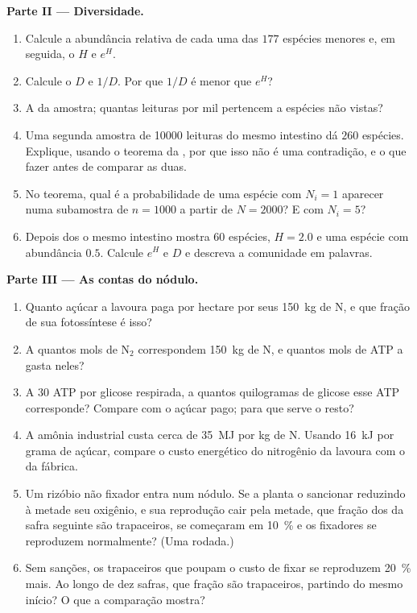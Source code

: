 \begin{problem}
\medskip
\noindent\textbf{Parte II --- Diversidade.}
\begin{enumerate}[resume]
  \item Calcule a abundância relativa de cada uma das $177$ espécies
        menores e, em seguida, o  $H$ e $e^{H}$.
  \item Calcule o  $D$ e $1/D$. Por que $1/D$ é menor
        que $e^{H}$?
  \item A  da amostra; quantas leituras por mil
        pertencem a espécies não vistas?
  \item Uma segunda amostra de \num{10000} leituras do mesmo intestino
        dá $260$ espécies. Explique, usando o teorema da , por
        que isso não é uma contradição, e o que fazer antes de comparar
        as duas.
  \item No teorema, qual é a probabilidade de uma espécie com
        $N_{i} = 1$ aparecer numa subamostra de $n = 1000$ a partir de
        $N =
        2000$? E com $N_{i} = 5$?
  \item Depois dos  o mesmo intestino mostra $60$ espécies,
        $H = 2.0$ e uma espécie com abundância $0.5$. Calcule $e^{H}$ e
        $D$ e descreva a comunidade em palavras.
\end{enumerate}

\medskip
\noindent\textbf{Parte III --- As contas do nódulo.}
\begin{enumerate}[resume]
  \item Quanto açúcar a lavoura paga por hectare por seus
        \qty{150}{kg} de N, e que fração de sua fotossíntese é isso?
  \item A quantos mols de N$_{2}$ correspondem \qty{150}{kg} de N, e
        quantos mols de ATP a  gasta neles?
  \item A $30$ ATP por glicose respirada, a quantos quilogramas de
        glicose esse ATP corresponde? Compare com o açúcar pago; para
        que serve o resto?
  \item A amônia industrial custa cerca de \qty{35}{MJ} por kg de N.
        Usando \qty{16}{kJ} por grama de açúcar, compare o custo
        energético do nitrogênio da lavoura com o da fábrica.
  \item Um rizóbio não fixador entra num nódulo. Se a planta o
        sancionar reduzindo à metade seu oxigênio, e sua reprodução cair
        pela metade, que fração dos  da safra seguinte são
        trapaceiros, se começaram em \qty{10}{\%} e os fixadores se
        reproduzem normalmente? (Uma rodada.)
  \item Sem sanções, os trapaceiros que poupam o custo de fixar se
        reproduzem \qty{20}{\%} mais. Ao longo de dez safras, que fração
        são trapaceiros, partindo do mesmo início? O que a comparação
        mostra?
\end{enumerate}


\end{problem}
